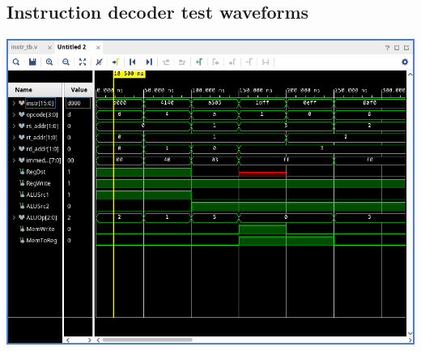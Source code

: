 \documentclass[12pt,a4paper]{article}
\begin{document}
\subsection*{Instruction decoder test waveforms}
\includegraphics[width=\textwidth]{image}
\end{document}

